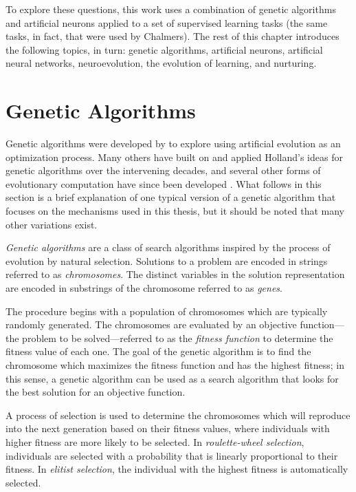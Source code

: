\documentclass[master]{outhesis}
\begin{document}
To explore these questions, this work uses a combination of genetic algorithms and artificial neurons applied to a set of supervised learning tasks (the same tasks, in fact, that were used by Chalmers). The rest of this chapter introduces the following topics, in turn: genetic algorithms, artificial neurons, artificial neural networks, neuroevolution, the evolution of learning, and nurturing.

\section{Genetic Algorithms}

Genetic algorithms were developed by \citet{Holland:1975aa} to explore using artificial evolution as an optimization process.
Many others have built on and applied Holland's ideas for genetic algorithms over the intervening decades,
and several other forms of evolutionary computation have since been developed \citep{Engelbrecht:2007aa}.
What follows in this section is a brief explanation of one typical version of a genetic algorithm that focuses on the mechanisms used in this thesis,
but it should be noted that many other variations exist.

\emph{Genetic algorithms} are a class of search algorithms inspired by the process of evolution by natural selection.
Solutions to a problem are encoded in strings referred to as \emph{chromosomes}.
The distinct variables in the solution representation are encoded in substrings of the chromosome referred to as \emph{genes}.

The procedure begins with a population of chromosomes which are typically randomly generated.
The chromosomes are evaluated by an objective function---the problem to be solved---referred to as the \emph{fitness function} to determine the fitness value of each one.
The goal of the genetic algorithm is to find the chromosome which maximizes the fitness function and has the highest fitness;
in this sense, a genetic algorithm can be used as a search algorithm that looks for the best solution for an objective function.

A process of selection is used to determine the chromosomes which will reproduce into the next generation based on their fitness values,
 where individuals with higher fitness are more likely to be selected.
 In \emph{roulette-wheel selection}, individuals are selected with a probability that is linearly proportional to their fitness.
 In \emph{elitist selection}, the individual with the highest fitness is automatically selected.
\end{document}
